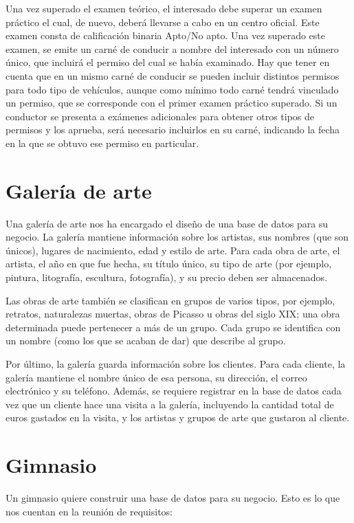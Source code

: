 \documentclass{db-practice}
\begin{document}
Una vez superado el examen teórico, el interesado debe superar un examen práctico el cual, de nuevo, deberá llevarse a cabo en un centro oficial. Este examen consta de calificación binaria Apto/No apto. Una vez superado este examen, se emite un carné de conducir a nombre del interesado con un número único, que incluirá el permiso del cual se había examinado. Hay que tener en cuenta que en un mismo carné de conducir se pueden incluir distintos permisos para todo tipo de vehículos, aunque como mínimo todo carné tendrá vinculado un permiso, que se corresponde con el primer examen práctico superado. Si un conductor se presenta a exámenes adicionales para obtener otros tipos de permisos y los aprueba, será necesario incluirlos en su carné, indicando la fecha en la que se obtuvo ese permiso en particular.

\section{Galería de arte}
Una galería de arte nos ha encargado el diseño de una base de datos para su negocio. La galería mantiene información sobre los artistas, sus nombres (que son únicos), lugares de nacimiento, edad y estilo de arte. Para cada obra de arte, el artista, el año en que fue hecha, su título único, su tipo de arte (por ejemplo, pintura, litografía, escultura, fotografía), y su precio deben ser almacenados. 

Las obras de arte también se clasifican en grupos de varios tipos, por ejemplo, retratos, naturalezas muertas, obras de Picasso u obras del siglo XIX; una obra determinada puede pertenecer a más de un grupo. Cada grupo se identifica con un nombre (como los que se acaban de dar) que describe al grupo. 

Por último, la galería guarda información sobre los clientes. Para cada cliente, la galería mantiene el nombre único de esa persona, su dirección, el correo electrónico y su teléfono. Además, se requiere registrar en la base de datos cada vez que un cliente hace una visita a la galería, incluyendo la cantidad total de euros gastados en la visita, y los artistas y grupos de arte que gustaron al cliente.

\section{Gimnasio}
Un gimnasio quiere construir una base de datos para su negocio. Esto es lo que nos cuentan en la reunión de requisitos:
\end{document}
